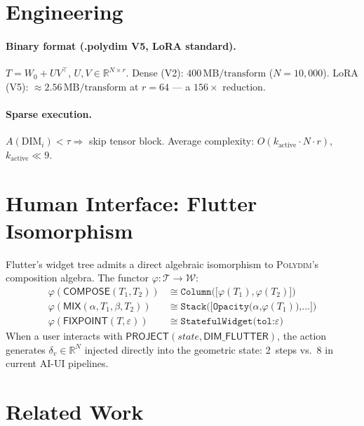 \documentclass[10pt,twocolumn]{article}
\theoremstyle{plain}
\theoremstyle{definition}
\theoremstyle{remark}
\newcommand{\RR}{\mathbb{R}}
\newcommand{\Compose}{\mathsf{COMPOSE}}
\newcommand{\Mix}{\mathsf{MIX}}
\newcommand{\Fixpoint}{\mathsf{FIXPOINT}}
\newcommand{\Project}{\mathsf{PROJECT}}
\begin{document}
\section{Engineering}

\paragraph{Binary format (.polydim V5, LoRA standard).}
$T=W_0+UV^\top$, $U,V\in\RR^{N\times r}$.
Dense (V2): $400\,\mathrm{MB}/\mathrm{transform}$ ($N=10{,}000$).
LoRA (V5): $\approx2.56\,\mathrm{MB}/\mathrm{transform}$ at $r=64$
--- a $156\times$ reduction.

\paragraph{Sparse execution.}
$A(\mathrm{DIM}_i)<\tau\Rightarrow$ skip tensor block.
Average complexity: $O(k_{\mathrm{active}}\cdot N\cdot r)$,
$k_{\mathrm{active}}\ll 9$.

\section{Human Interface: Flutter Isomorphism}

Flutter's widget tree admits a direct algebraic isomorphism to
\textsc{Polydim}'s composition algebra. The functor
$\varphi\colon\mathcal{T}\to\mathcal{W}$:
\begin{align*}
\varphi(\Compose(T_1,T_2))        &\cong \texttt{Column([$\varphi(T_1),\varphi(T_2)$])}\\
\varphi(\Mix(\alpha,T_1,\beta,T_2))&\cong \texttt{Stack([Opacity($\alpha$,$\varphi(T_1)$),$\ldots$])}\\
\varphi(\Fixpoint(T,\varepsilon))  &\cong \texttt{StatefulWidget(tol:$\varepsilon$)}
\end{align*}
When a user interacts with $\Project(\mathit{state},\mathsf{DIM\_FLUTTER})$,
the action generates $\delta_v\in\RR^N$ injected directly into the geometric
state: 2~steps vs.\ 8 in current AI-UI pipelines.

\section{Related Work}
\end{document}
